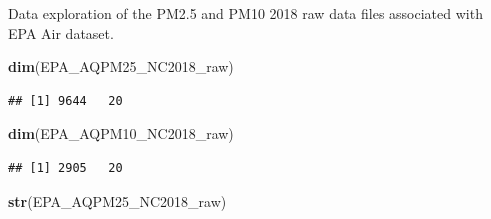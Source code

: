 \documentclass[12pt,]{article}
\newenvironment{Shaded}{\begin{snugshade}}{\end{snugshade}}
\newcommand{\KeywordTok}[1]{\textcolor[rgb]{0.13,0.29,0.53}{\textbf{#1}}}
\newcommand{\DataTypeTok}[1]{\textcolor[rgb]{0.13,0.29,0.53}{#1}}
\newcommand{\StringTok}[1]{\textcolor[rgb]{0.31,0.60,0.02}{#1}}
\newcommand{\CommentTok}[1]{\textcolor[rgb]{0.56,0.35,0.01}{\textit{#1}}}
\newcommand{\OperatorTok}[1]{\textcolor[rgb]{0.81,0.36,0.00}{\textbf{#1}}}
\newcommand{\NormalTok}[1]{#1}
\begin{document}
\begin{Shaded}
\end{Shaded}

Data exploration of the PM2.5 and PM10 2018 raw data files associated
with EPA Air dataset.

\begin{Shaded}
\begin{Highlighting}[]
\KeywordTok{dim}\NormalTok{(EPA_AQPM25_NC2018_raw)}
\end{Highlighting}
\end{Shaded}

\begin{verbatim}
## [1] 9644   20
\end{verbatim}

\begin{Shaded}
\begin{Highlighting}[]
\KeywordTok{dim}\NormalTok{(EPA_AQPM10_NC2018_raw)}
\end{Highlighting}
\end{Shaded}

\begin{verbatim}
## [1] 2905   20
\end{verbatim}

\begin{Shaded}
\begin{Highlighting}[]
\KeywordTok{str}\NormalTok{(EPA_AQPM25_NC2018_raw)}
\end{Highlighting}
\end{Shaded}
\end{document}
